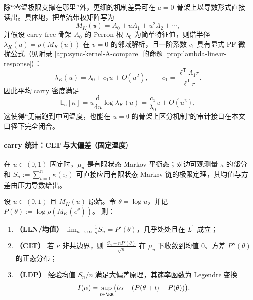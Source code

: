 \begin{remark}[零温谱的“可微指纹”：从 \texorpdfstring{$u=0$}{u=0} 骨架读出一阶响应]\label{rem:kernel-zero-temp-differential-fingerprint}
除“零温极限支撑在哪里”外，更细的机制差异可在 \(u=0\) 骨架上以导数形式直接读出。具体地，把单流带权矩阵写为
\[
M_K(u)=A_0+uA_1+u^2A_2+\cdots,
\]
并假设 carry-free 骨架 \(A_0\) 的 Perron 根 \(\lambda_0\) 为简单特征值，则谱半径 \(\lambda_K(u)=\rho(M_K(u))\) 在 \(u=0\) 的邻域解析，且一阶系数 \(c_1\) 具有显式 PF 微扰公式（见附录 \ref{app:sync-kernel-A-compare} 的命题 \ref{prop:lambda-linear-response}）：
\[
\lambda_K(u)=\lambda_0+c_1u+O(u^2),
\qquad
c_1=\frac{\ell^{\mathsf T}A_1 r}{\ell^{\mathsf T}r}.
\]
因此平均 carry 密度满足
\[
\mathbb{E}_u[\kappa]
=u\frac{\mathrm{d}}{\mathrm{d}u}\log\lambda_K(u)
=\frac{c_1}{\lambda_0}u+O(u^2),
\]
这使得“无需跑到中间温度，也能在 \(u=0\) 的骨架上区分机制”的审计接口在本文口径下完全闭合。
\end{remark}

\paragraph{carry 统计：CLT 与大偏差（固定温度）}
在 \(u\in(0,1)\) 固定时，\(\mu_u\) 是有限状态 Markov 平衡态；对边可观测量 \(\kappa\) 的部分和
\(
S_n:=\sum_{t=1}^{n}\kappa(e_t)
\)
可直接应用有限状态 Markov 链的极限定理，其均值与方差由压力导数给出。

\begin{proposition}\label{prop:kernel-clt-ldp}
设 \(u\in(0,1)\) 且 \(M_K(u)\) 原始。令 \(\theta=\log u\)，并记
\(
P(\theta):=\log\rho(M_K(e^\theta))
\)。
则：
\begin{enumerate}
  \item \textbf{（LLN/均值）} \(\lim_{n\to\infty}\frac{1}{n}S_n=P'(\theta)\)，几乎处处且在 \(L^1\) 成立；
  \item \textbf{（CLT）} 若 \(\kappa\) 非共边界，则
  \(
  \frac{S_n-nP'(\theta)}{\sqrt{n}}
  \)
  在 \(\mu_u\) 下收敛到均值 \(0\)、方差 \(P''(\theta)\) 的正态分布；
  \item \textbf{（LDP）} 经验均值 \(S_n/n\) 满足大偏差原理，其速率函数为 Legendre 变换
  \[
  I(\alpha)=\sup_{t\in\RR}\bigl(t\alpha-(P(\theta+t)-P(\theta))\bigr).
  \]
\end{enumerate}
\end{proposition}

